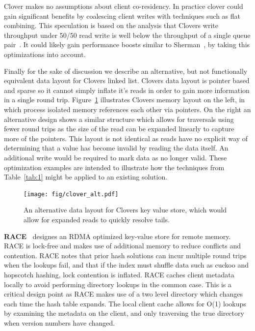 Clover makes no assumptions about client co-residency. In practice clover could
gain significant benefits by coalescing client writes with techniques such as
flat combining. This speculation is based on the analysis that Clovers write
throughput under 50/50 read write is well below the throughput of a single queue
pair~\cite{design-guidelines}. It could likely gain performance boosts similar
to Sherman~\cite{sherman}, by taking this optimizations into account. 

Finally for the sake of discussion we describe an alternative, but not
functionally equivalent data layout for Clovers linked list. Clovers data layout
is pointer based and sparse so it cannot simply inflate it's reads in order to
gain more information in a single round trip. Figure~\ref{fig:clover_alt}
illustrates Clovers memory layout on the left, in which process isolated memory
references each other via pointers. On the right an alternative design shows a
similar structure which allows for traversals using fewer round trips as the
size of the read can be expanded linearly to capture more of the pointers. This
layout is not identical as reads have no explicit way of determining that a
value has become invalid by reading the data itself. An additional write would
be required to mark data as no longer valid. These optimization examples are
intended to illustrate how the techniques from Table~\ref{tab:1} might be
applied to an existing solution.

\begin{figure}
    \texttt{[image: fig/clover\_alt.pdf]}

    \caption{An alternative data layout for Clovers key value store, which would
    allow for expanded reads to quickly resolve tails.}

    \label{fig:clover_alt}
\end{figure}


\textbf{RACE~\cite{one-sided-hash}}
designes an RDMA optimized key-value store for remote memory. RACE is
lock-free and makes use of additional memory to reduce conflicts and contention.
RACE notes that prior hash solutions can incur multiple round trips when the
lookups fail, and that if the index must shuffle data such as cuckoo and
hopscotch hashing, lock contention is inflated. RACE caches client metadata
locally to avoid performing directory lookups in the common case. This is a
critical design point as RACE makes use of a two level directory which changes
each time the hash table expands. The local client cache allows for O(1) lookups
by examining the metadata on the client, and only traversing the true directory
when version numbers have changed.

